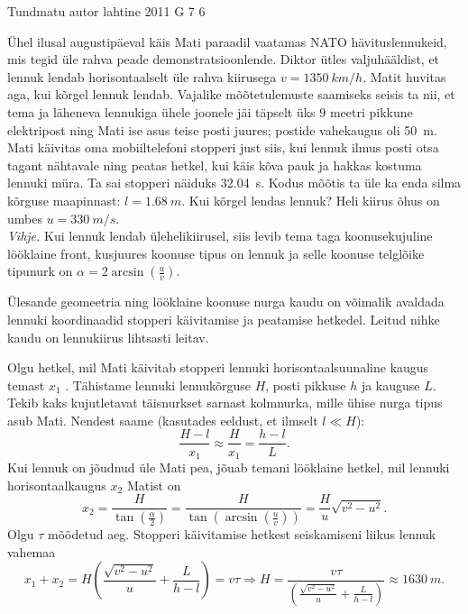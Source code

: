 {Tundmatu autor} %
{lahtine} %
{2011} %
{G 7} %
{6} %
{
\ifStatement
Ühel ilusal augustipäeval käis Mati paraadil vaatamas NATO hävituslennukeid, mis
tegid üle rahva peade demonstratsioonlende. Diktor ütles valjuhääldist, et lennuk
lendab horisontaalselt üle rahva kiirusega $v=\SI{1350}{km/h}$. Matit huvitas aga, kui
kõrgel lennuk lendab. Vajalike mõõtetulemuste saamiseks seisis ta nii, et tema
ja läheneva lennukiga ühele joonele jäi täpselt üks 9 meetri pikkune elektripost
ning Mati ise asus teise posti juures; postide vahekaugus oli \SI{50}{m}. Mati käivitas oma
mobiiltelefoni stopperi just siis, kui lennuk ilmus posti otsa tagant nähtavale ning 
peatas hetkel, kui käis kõva pauk ja hakkas kostuma lennuki müra. Ta sai
stopperi näiduks \SI{32,04}{s}. Kodus
mõõtis ta üle ka enda silma kõrguse maapinnast: $l=\SI{1,68}{m}$.
Kui kõrgel lendas lennuk? Heli kiirus õhus on umbes
$u=\SI{330}{m/s}$.\\ 
\textit{Vihje.} Kui lennuk lendab
ülehelikiirusel, siis levib tema taga
koonusekujuline lööklaine front, kusjuures koonuse tipus on lennuk ja selle
koonuse telglõike
tipunurk on $\alpha=2\arcsin\left(\frac{u}{v}\right)$.
\fi


\ifHint
Ülesande geomeetria ning lööklaine koonuse nurga kaudu on võimalik avaldada lennuki koordinaadid stopperi käivitamise ja peatamise hetkedel. Leitud nihke kaudu on lennukiirus lihtsasti leitav.
\fi


\ifSolution
Olgu hetkel, mil Mati käivitab stopperi lennuki horisontaalsuunaline kaugus
temast $x_{1}$ . Tähistame lennuki lennukõrguse $H$, posti pikkuse $h$ ja
kauguse
$L$. Tekib kaks kujutletavat täisnurkset sarnast kolmnurka, mille ühise nurga
tipus asub Mati. Nendest saame (kasutades eeldust, et ilmselt $l\ll H$):
\[\frac{H-l}{x_{1}}\approx\frac{H}{x_{1}}=\frac{h-l}{L}. \]
Kui lennuk on jõudnud üle Mati pea, jõuab temani lööklaine hetkel, mil lennuki horisontaalkaugus $x_{2}$ Matist on
\[ x_{2}=\frac{H}{\tan\left(\frac{\alpha}{2}\right)}=\frac{H}{\tan\left(\arcsin\left(\frac{u}{v}\right)\right)}=\frac{H}{u}\sqrt{v^2-u^2}.
\]
Olgu $\tau$ mõõdetud aeg. Stopperi käivitamise hetkest seiskamiseni liikus lennuk vahemaa
\[ x_1+x_2=H\left(\frac{\sqrt{v^2-u^2}}{u} +\frac{L}{h-l}\right)=v\tau
\Rightarrow
H=\frac{v\tau}{\left(\frac{\sqrt{v^2-u^2}}{u} +\frac{L}{h-l}\right)}\approx
\SI{1630}{m}.
\]
\fi
}